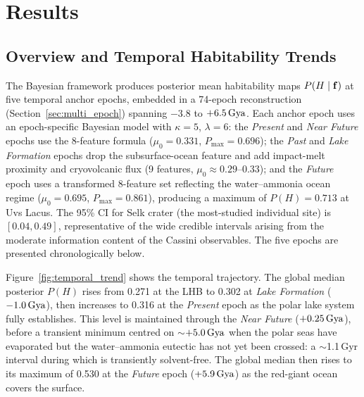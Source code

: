 \chapter{Results}
\label{ch:results}

\section{Overview and Temporal Habitability Trends}
\label{sec:results_overview}

The Bayesian framework produces posterior mean habitability maps $P(H \mid \mathbf{f})$ at five temporal anchor epochs, embedded in a 74-epoch reconstruction (Section~\ref{sec:multi_epoch}) spanning $-3.8$ to $+6.5\,\text{Gya}$.  Each anchor epoch uses an epoch-specific Bayesian model with $\kappa=5$, $\lambda=6$: the \textit{Present} and \textit{Near Future} epochs use the 8-feature formula ($\mu_0=0.331$, $P_\text{max}=0.696$); the \textit{Past} and \textit{Lake Formation} epochs drop the subsurface-ocean feature and add impact-melt proximity and cryovolcanic flux (9 features, $\mu_0 \approx 0.29$--$0.33$); and the \textit{Future} epoch uses a transformed 8-feature set reflecting the water--ammonia ocean regime ($\mu_0=0.695$, $P_\text{max}=0.861$), producing a maximum of $P(H)=0.713$ at Uvs Lacus.  The 95\% CI for Selk crater (the most-studied individual site) is $[0.04, 0.49]$, representative of the wide credible intervals arising from the moderate information content of the Cassini observables.  The five epochs are presented chronologically below.

Figure~\ref{fig:temporal_trend} shows the temporal trajectory.  The global median posterior $P(H)$ rises from 0.271 at the LHB to 0.302 at \textit{Lake Formation} ($-1.0\,\text{Gya}$), then increases to 0.316 at the \textit{Present} epoch as the polar lake system fully establishes.  This level is maintained through the \textit{Near Future} ($+0.25\,\text{Gya}$), before a transient minimum centred on $\sim$$+5.0\,\text{Gya}$ when the polar seas have evaporated but the water--ammonia eutectic has not yet been crossed: a $\sim$1.1\,Gyr interval during which \titan{} is transiently solvent-free.  The global median then rises to its maximum of 0.530 at the \textit{Future} epoch ($+5.9\,\text{Gya}$) as the red-giant ocean covers the surface.

